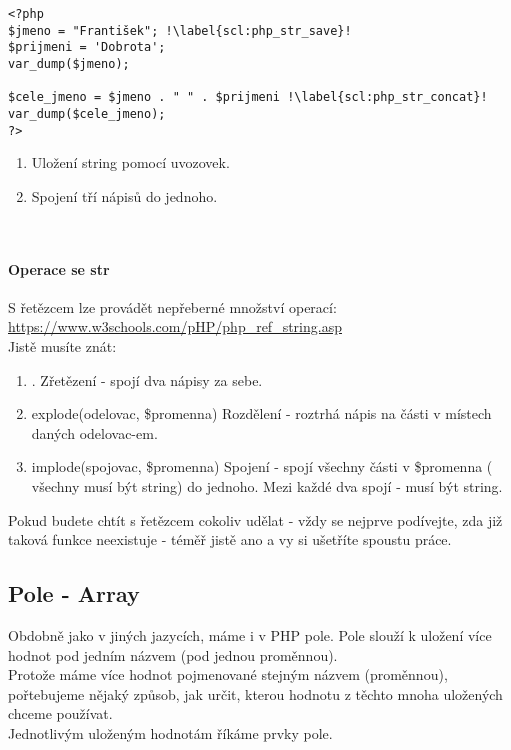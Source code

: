 \begin{minipage}[t]{.45\textwidth}
\begin{code}
\begin{verbatim}
<?php 
$jmeno = "František"; !\label{scl:php_str_save}!
$prijmeni = 'Dobrota';
var_dump($jmeno);

$cele_jmeno = $jmeno . " " . $prijmeni !\label{scl:php_str_concat}!
var_dump($cele_jmeno);
?>
\end{verbatim}

\label{code:typy_float}
\end{code}
\end{minipage}
\begin{minipage}[t]{.45\textwidth}
\begin{enumerate}
\item[ř. \ref{scl:php_str_save}:] Uložení string pomocí uvozovek.
\item[ř. \ref{scl:php_str_concat}:] Spojení tří nápisů do jednoho.
\end{enumerate}
\end{minipage}\\ 

\paragraph{Operace se str}
S řetězcem lze provádět nepřeberné množství operací: \url{https://www.w3schools.com/pHP/php_ref_string.asp}\\
Jistě musíte znát:
\begin{enumerate}
\item[] .  Zřetězení - spojí dva nápisy za sebe.
\item[] explode(odelovac, \$promenna) Rozdělení - roztrhá nápis na části v místech daných odelovac-em.
\item[] implode(spojovac, \$promenna) Spojení - spojí všechny části v \$promenna ( všechny musí být string) do jednoho. Mezi každé dva spojí  - musí být string.
\end{enumerate}
Pokud budete chtít s řetězcem cokoliv udělat - vždy se nejprve podívejte, zda již taková funkce neexistuje - téměř jistě ano a vy si ušetříte spoustu práce.

\subsection{Pole - Array}
Obdobně jako v jiných jazycích, máme i v PHP pole. Pole slouží k uložení více hodnot pod jedním názvem (pod jednou proměnnou).\\
Protože máme více hodnot pojmenované stejným názvem (proměnnou), pořtebujeme nějaký způsob, jak určit, kterou hodnotu z těchto mnoha uložených chceme používat.\\
Jednotlivým uloženým hodnotám říkáme prvky pole.

